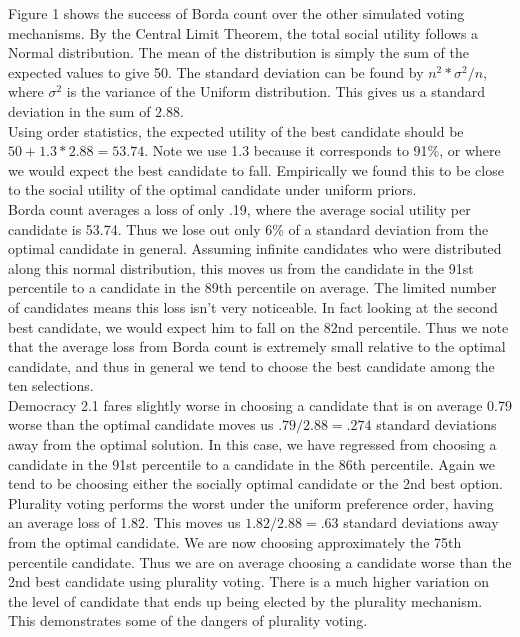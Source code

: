 \documentclass[11pt]{scrartcl}
\begin{document}
Figure 1 shows the success of Borda count over the other simulated voting mechanisms. By the Central Limit Theorem, the total social utility follows a Normal distribution. The mean of the distribution is simply the sum of the expected values to give 50. The standard deviation can be found by $n^2 * \sigma^2/n$, where $\sigma^2$ is the variance of the Uniform distribution. This gives us a standard deviation in the sum of $2.88$.\\

Using order statistics, the expected utility of the best candidate should be $50 + 1.3*2.88 = 53.74$. Note we use 1.3 because it corresponds to 91\%, or where we would expect the best candidate to fall. Empirically we found this to be close to the social utility of the optimal candidate under uniform priors.\\

Borda count averages a loss of only .19, where the average social utility per candidate is 53.74. Thus we lose out only 6\% of a standard deviation from the optimal candidate in general. Assuming infinite candidates who were distributed along this normal distribution, this moves us from the candidate in the 91st percentile to a candidate in the 89th percentile on average. The limited number of candidates means this loss isn't very noticeable. In fact looking at the second best candidate, we would expect him to fall on the 82nd percentile. Thus we note that the average loss from Borda count is extremely small relative to the optimal candidate, and thus in general we tend to choose the best candidate among the ten selections.\\

Democracy 2.1 fares slightly worse in choosing a candidate that is on average 0.79 worse than the optimal candidate moves us $.79/2.88 = .274$ standard deviations away from the optimal solution. In this case, we have regressed from choosing a candidate in the 91st percentile to a candidate in the 86th percentile. Again we tend to be choosing either the socially optimal candidate or the 2nd best option.\\

Plurality voting performs the worst under the uniform preference order, having an average loss of 1.82. This moves us $1.82/2.88 = .63$ standard deviations away from the optimal candidate. We are now choosing approximately the 75th percentile candidate. Thus we are on average choosing a candidate worse than the 2nd best candidate using plurality voting. There is a much higher variation on the level of candidate that ends up being elected by the plurality mechanism. This demonstrates some of the dangers of plurality voting.\\
\end{document}
